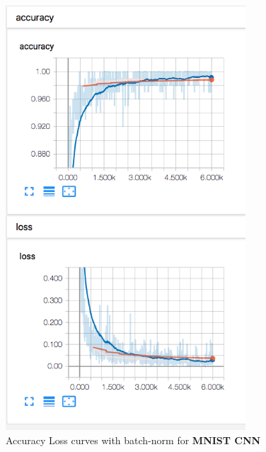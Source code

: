 \begin{figure}[ht]
\centering
\includegraphics[angle=0,width=0.8\textwidth]{assign-2/logs/train/bn.png}
\caption{Accuracy Loss curves with batch-norm for \textbf{MNIST CNN}}
\end{figure}


